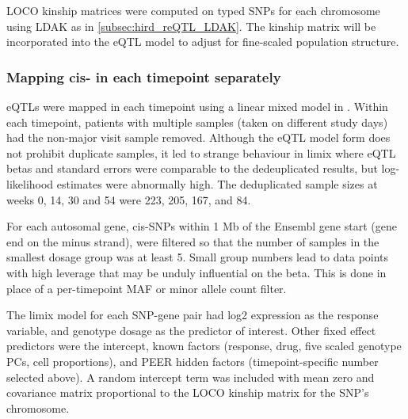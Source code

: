 \begin{outline}
\gls{LOCO} kinship matrices were computed on typed \glspl{SNP} for each chromosome using LDAK as in \autoref{subsec:hird_reQTL_LDAK}.
The kinship matrix will be incorporated into the \gls{eQTL} model to adjust for fine-scaled population structure.

\subsubsection{Mapping cis- in each timepoint separately}

\glspl{eQTL} were mapped in each timepoint using a linear mixed model in .
Within each timepoint, patients with multiple samples (taken on different study days) had the non-major visit sample removed.
%
%
Although the \gls{eQTL} model form does not prohibit duplicate samples,
it led to strange behaviour in limix where \gls{eQTL} betas and standard errors were comparable to the dedeuplicated results,
but log-likelihood estimates were abnormally high.
The deduplicated sample sizes at weeks 0, 14, 30 and 54 were 223, 205, 167, and 84.

For each autosomal gene, cis-\glspl{SNP} within 1 Mb of the Ensembl gene start (gene end on the minus strand),
were filtered so that the number of samples in the smallest dosage group was at least 5.
Small group numbers lead to data points with high leverage that may be unduly influential on the beta.
This is done in place of a per-timepoint \gls{MAF} or minor allele count filter.

The limix model for each \gls{SNP}-gene pair had 
log2 expression as the response variable,
and genotype dosage as the predictor of interest.
Other fixed effect predictors were
the intercept,
known factors (response, drug, five scaled genotype \glspl{PC}, cell proportions), 
and PEER hidden factors (timepoint-specific number selected above).
A random intercept term was included with mean zero and covariance matrix proportional to the \gls{LOCO} kinship matrix for the \gls{SNP}'s chromosome.


\end{outline}
